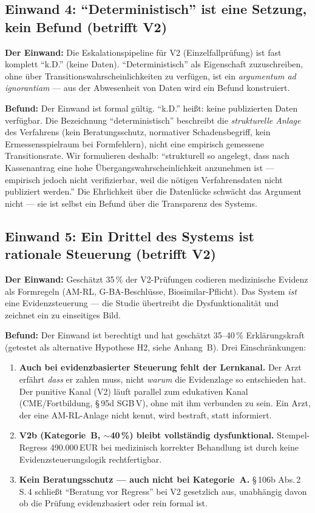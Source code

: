 \documentclass{umbruch-position}
\begin{document}
\subsection{Einwand 4: ``Deterministisch'' ist eine Setzung, kein Befund (betrifft V2)}

\textbf{Der Einwand:} Die Eskalationspipeline für V2 (Einzelfallprüfung) ist fast komplett ``k.D.'' (keine Daten). ``Deterministisch'' als Eigenschaft zuzuschreiben, ohne über Transitionswahrscheinlichkeiten zu verfügen, ist ein \textit{argumentum ad ignorantiam} --- aus der Abwesenheit von Daten wird ein Befund konstruiert.

\textbf{Befund:} Der Einwand ist formal gültig. ``k.D.'' heißt: keine publizierten Daten verfügbar. Die Bezeichnung ``deterministisch'' beschreibt die \textit{strukturelle Anlage} des Verfahrens (kein Beratungsschutz, normativer Schadensbegriff, kein Ermessensspielraum bei Formfehlern), nicht eine empirisch gemessene Transitionsrate. Wir formulieren deshalb: ``strukturell so angelegt, dass nach Kassenantrag eine hohe Übergangswahrscheinlichkeit anzunehmen ist --- empirisch jedoch nicht verifizierbar, weil die nötigen Verfahrensdaten nicht publiziert werden.'' Die Ehrlichkeit über die Datenlücke schwächt das Argument nicht --- sie ist selbst ein Befund über die Transparenz des Systems.

\subsection{Einwand 5: Ein Drittel des Systems ist rationale Steuerung (betrifft V2)}

\textbf{Der Einwand:} Geschätzt 35\,\% der V2-Prüfungen codieren medizinische Evidenz als Formregeln (AM-RL, G-BA-Beschlüsse, Biosimilar-Pflicht). Das System \textit{ist} eine Evidenzsteuerung --- die Studie übertreibt die Dysfunktionalität und zeichnet ein zu einseitiges Bild.

\textbf{Befund:} Der Einwand ist berechtigt und hat geschätzt 35--40\,\% Erklärungskraft (getestet als alternative Hypothese H2, siehe Anhang~B). Drei Einschränkungen:

\begin{enumerate}[nosep]
  \item \textbf{Auch bei evidenzbasierter Steuerung fehlt der Lernkanal.} Der Arzt erfährt \textit{dass} er zahlen muss, nicht \textit{warum} die Evidenzlage so entschieden hat. Der punitive Kanal (V2) läuft parallel zum edukativen Kanal (CME/Fortbildung, \S\,95d SGB\,V), ohne mit ihm verbunden zu sein. Ein Arzt, der eine AM-RL-Anlage nicht kennt, wird bestraft, statt informiert.
  \item \textbf{V2b (Kategorie~B, ${\sim}$40\,\%) bleibt vollständig dysfunktional.} Stempel-Regress 490.000\,EUR bei medizinisch korrekter Behandlung ist durch keine Evidenzsteuerungslogik rechtfertigbar.
  \item \textbf{Kein Beratungsschutz --- auch nicht bei Kategorie~A.} \S\,106b Abs.\,2 S.\,4 schließt ``Beratung vor Regress'' bei V2 gesetzlich aus, unabhängig davon ob die Prüfung evidenzbasiert oder rein formal ist.
\end{enumerate}
\end{document}
